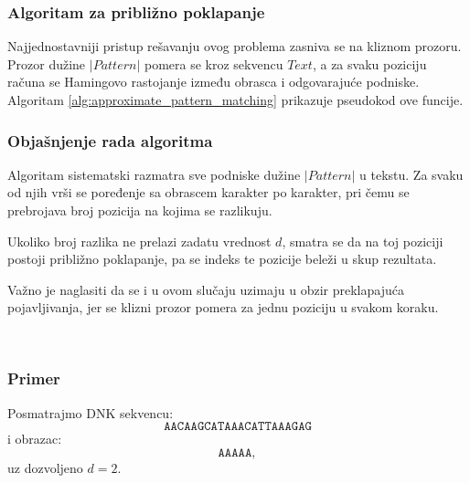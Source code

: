 \documentclass[12pt,oneside]{memoir}
\begin{document}
\subsubsection{Algoritam za približno poklapanje}

Najjednostavniji pristup rešavanju ovog problema zasniva se na kliznom prozoru. Prozor dužine $|Pattern|$ pomera se kroz sekvencu $Text$, a za svaku poziciju računa se Hamingovo rastojanje između obrasca i odgovarajuće podniske. Algoritam \ref{alg:approximate_pattern_matching} prikazuje pseudokod ove funcije.

\begin{algorithm}[h]
\caption{Approximate Pattern Matching}
\label{alg:approximate_pattern_matching}
\SetAlgoLined
\DontPrintSemicolon
{}
\end{algorithm}

\subsubsection{Objašnjenje rada algoritma}

Algoritam sistematski razmatra sve podniske dužine $|Pattern|$ u tekstu. Za svaku od njih vrši se poređenje sa obrascem karakter po karakter, pri čemu se prebrojava broj pozicija na kojima se razlikuju.

Ukoliko broj razlika ne prelazi zadatu vrednost $d$, smatra se da na toj poziciji postoji približno poklapanje, pa se indeks te pozicije beleži u skup rezultata.

Važno je naglasiti da se i u ovom slučaju uzimaju u obzir preklapajuća pojavljivanja, jer se klizni prozor pomera za jednu poziciju u svakom koraku.

\
\subsubsection{Primer}

Posmatrajmo DNK sekvencu:
\[
\texttt{AACAAGCATAAACATTAAAGAG}
\]
i obrazac:
\[
\texttt{AAAAA},
\]
uz dozvoljeno $d = 2$.
\end{document}
